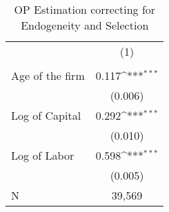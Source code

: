 \begin{table}[htbp]\centering
\def\sym#1{\ifmmode^{#1}\else\(^{#1}\)\fi}
\caption{OP Estimation correcting for Endogeneity and Selection \label{tab:q5e}}
\begin{tabular}{l*{1}{c}}
\toprule
                    &\multicolumn{1}{c}{(1)}\\
                    &\multicolumn{1}{c}{} \\
\midrule
Age of the firm     &       0.117\sym{***}\\
                    &     (0.006)         \\
\addlinespace
Log of Capital      &       0.292\sym{***}\\
                    &     (0.010)         \\
\addlinespace
Log of Labor        &       0.598\sym{***}\\
                    &     (0.005)         \\
\midrule
N                   &      39,569         \\
\bottomrule
\end{tabular}
\end{table}
